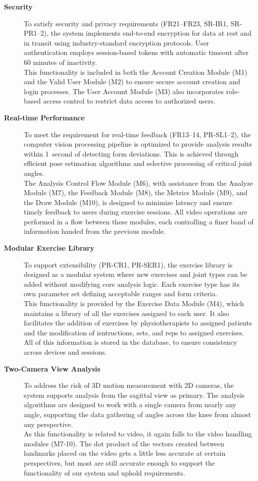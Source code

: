 \documentclass[12pt, titlepage]{article}
\begin{document}
\begin{description}
	\item[\textbf{Security}] To satisfy security and privacy requirements (FR21--FR23, SR-IR1, SR-PR1--2), the system implements end-to-end encryption for data at rest and in transit using industry-standard encryption protocols. User authentication employs session-based tokens with automatic timeout after 60 minutes of inactivity. \\
	This functionality is included in both the Account Creation Module (M1) and the Valid User Module (M2) to ensure secure account creation and login processes. The User Account Module (M3) also incorporates role-based access control to restrict data access to authorized users.
	\item[\textbf{Real-time Performance}] To meet the requirement for real-time feedback (FR13--14, PR-SL1--2), the computer vision processing pipeline is optimized to provide analysis results within 1~second of detecting form deviations. This is achieved through efficient pose estimation algorithms and selective processing of critical joint angles. \\
	The Analysis Control Flow Module (M6), with assistance from the Analyze Module (M7), the Feedback Module (M8), the Metrics Module (M9), and the Draw Module (M10), is designed to minimize latency and ensure timely feedback to users during exercise sessions. All video operations are performed in a flow between these modules, each controlling a finer band of information handed from the previous module.
	\item[\textbf{Modular Exercise Library}] To support extensibility (PR-CR1, PR-SER1), the exercise library is designed as a modular system where new exercises and joint types can be added without modifying core analysis logic. Each exercise type has its own parameter set defining acceptable ranges and form criteria. \\
	This functionality is provided by the Exercise Data Module (M4), which maintains a library of all the exercises assigned to each user. It also facilitates the addition of exercises by physiotherapists to assigned patients and the modification of isntructions, sets, and reps to assigned exercises. All of this information is stored in the database, to ensure consistency across devices and sessions.
	\item[\textbf{Two-Camera View Analysis}] To address the risk of 3D motion measurement with 2D cameras, the system supports analysis from the sagittal view as primary. The analysis algorithms are designed to work with a single camera from nearly any angle, supporting the data gathering of angles across the knee from almost any perspective. \\
	As this functionality is related to video, it again falls to the video handling modules (M7-10). The dot product of the vectors created between landmarks placed on the video gets a little less accurate at certain perspectives, but most are still accurate enough to support the functionality of our system and uphold requirements.
\end{description}
\end{document}
